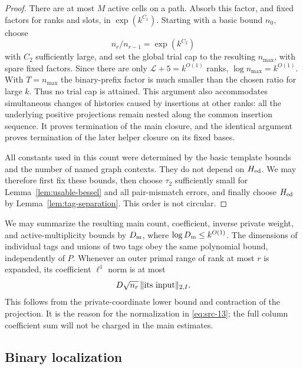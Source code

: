 \begin{proof}
There are at most $M$ active cells on a path.  Absorb this factor, and
fixed factors for ranks and slots, in $\exp(k^{C_1})$.  Starting with
a basic bound $n_0$, choose
\[
 n_r/n_{r-1}=\exp(k^{C_2})
\]
with $C_2$ sufficiently large, and set the global trial cap to the
resulting $n_{\max}$, with spare fixed factors.  Since there are only
$\mathcal L+5=k^{O(1)}$ ranks, $\log n_{\max}=k^{O(1)}$.
With $T=n_{\max}$ the binary-prefix factor is much smaller than the
chosen ratio for large $k$.  Thus no trial cap is attained.  This
argument also accommodates simultaneous changes of histories caused
by insertions at other ranks: all the underlying positive projections
remain nested along the common insertion sequence.  It proves
termination of the main closure, and the identical argument proves
termination of the later helper closure on its fixed bases.

All constants used in this count were determined by the basic template
bounds and the number of named graph contexts.  They do not depend on
$H_{\rm ed}$.  We may therefore first fix these bounds, then choose
$\tau_2$ sufficiently small for Lemma~\ref{lem:usable-bessel} and all
pair-mismatch errors, and finally choose $H_{\rm ed}$ by
Lemma~\ref{lem:tag-separation}.  This order is not circular.
\end{proof}

We may summarize the resulting main count, coefficient, inverse private
weight, and active-multiplicity bounds by $D_{\rm m}$, where
$\log D_{\rm m}\le k^{O(1)}$.  The dimensions of individual tags and
unions of two tags obey the same polynomial bound, independently of
$P$.  Whenever an outer primal range of rank at most $r$ is expanded,
its coefficient $\ell^1$ norm is at most
\[
 D\sqrt{n_r}\,\lVert \text{its input}\rVert_{2,I}.
\]
This follows from the private-coordinate lower bound and contraction
of the projection.  It is the reason for the normalization in
\eqref{eq:src-13}; the full column coefficient sum will not be charged
in the main estimates.

\subsection{Binary localization}

